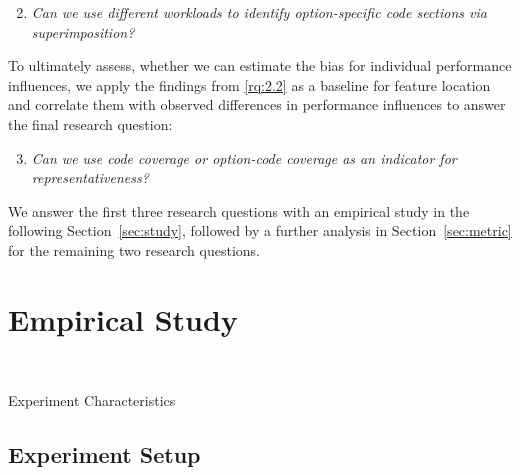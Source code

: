 \begin{enumerate}[align=left,label=RQ2.\arabic*]
	\setcounter{enumi}{1}
	\item\textit{Can we use different workloads to identify option-specific code sections via superimposition?}\label{rq:2.2}
\end{enumerate}

To ultimately assess, whether we can estimate the bias for individual performance influences, we apply the findings from \ref{rq:2.2} as a baseline for feature location and correlate them with observed differences in performance influences to answer the final research question:

\begin{enumerate}[align=left,label=RQ2.\arabic*]
	\setcounter{enumi}{2}
	\item\textit{Can we use code coverage or option-code coverage as an indicator for representativeness?}\label{rq:2.3}
\end{enumerate}

We answer the first three research questions with an empirical study in the following Section~\ref{sec:study}, followed by a further analysis in Section~\ref{sec:metric} for the remaining two research questions.

\section{Empirical Study}~\label{sec:study}
\begin{table*}[ht!]
	\centering
	\caption{Experiment Characteristics}
	
	\label{tab:subject_systems}
\end{table*}
\subsection{Experiment Setup}
